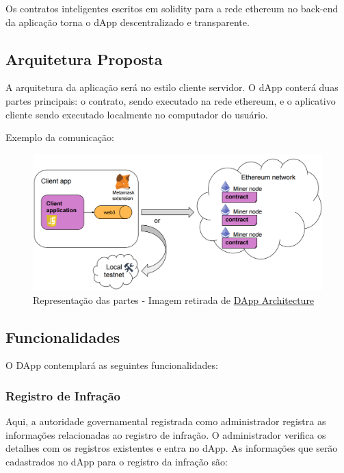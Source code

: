 Os contratos inteligentes escritos em solidity para a rede ethereum no back-end da aplicação torna o dApp descentralizado e transparente. 

\subsection{Arquitetura Proposta}

A arquitetura da aplicação será no estilo cliente servidor. O dApp conterá duas partes principais: o contrato, sendo executado na rede ethereum, e o aplicativo cliente sendo executado localmente no computador do usuário.

Exemplo da comunicação:

    \begin{figure}[H]
         \centering
         \includegraphics[scale=0.25]{figuras/capitulo_3/dapp_representacao_comunicacao.png}
         \caption{Representação das partes - Imagem retirada de \href{https://sites.google.com/site/blockchaintutorial/dapp-architecture}{DApp Architecture}}
         \label{fig:dapp_representacao}
    \end{figure}



\subsection{Funcionalidades}

O DApp contemplará as seguintes funcionalidades:


    \subsubsection{Registro de Infração}
    
        Aqui, a autoridade governamental registrada como administrador registra as informações relacionadas ao registro de infração. O administrador verifica os detalhes com os registros existentes e entra no dApp. As informações que serão cadastrados no dApp para o registro da infração são:
        

